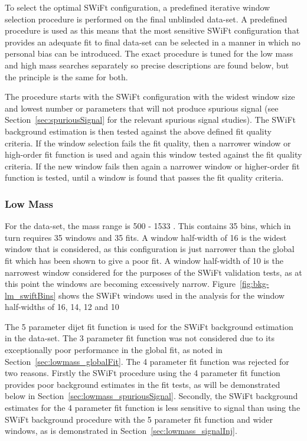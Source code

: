 To select the optimal SWiFt configuration, a predefined iterative window selection procedure is performed on the final unblinded data-set.
A predefined procedure is used as this means that the most sensitive SWiFt configuration that provides an adequate fit to final data-set can be selected
in a manner in which no personal bias can be introduced.
The exact procedure is tuned for the low mass and high mass searches separately so precise descriptions are found below,
but the principle is the same for both.

The procedure starts with the SWiFt configuration with the widest window size and lowest number or parameters that will not produce spurious signal
(see Section~\ref{sec:spuriousSignal} for the relevant spurious signal studies).
The SWiFt background estimation is then tested against the above defined fit quality criteria.
If the window selection fails the fit quality, then a narrower window or high-order fit function is used and again this window tested against the fit quality criteria.
If the new window fails then again a narrower window or higher-order fit function is tested, until a window is found that passes the fit quality criteria.


\subsubsection{Low Mass}
\label{sec:lowmass_windowSel}

For the \lm{} data-set, the mass range is 500 - 1533 \GeV{}. This contains 35 bins, which in turn requires 35 windows and 35 fits.
A window half-width of 16 is  the widest window that is considered,
as this configuration is just narrower than the global fit which has been shown to give a poor fit.
A window half-width of 10 is the narrowest window considered for the purposes of the SWiFt validation tests,
as at this point the windows are becoming excessively narrow.
Figure~\ref{fig:bkg-lm_swiftBins} shows the SWiFt windows used in the \lm{} analysis for the window half-widths of 16, 14, 12 and 10

The 5 parameter dijet fit function is used for the SWiFt background estimation in the \lm{} data-set.
The 3 parameter fit function was not considered due to its exceptionally poor performance in the global fit, as noted in Section~\ref{sec:lowmass_globalFit}.
The 4 parameter fit function was rejected for two reasons.
Firstly the SWiFt procedure using the 4 parameter fit function provides poor background estimates in the fit tests,
as will be demonstrated below in Section~\ref{sec:lowmass_spuriousSignal}.
Secondly, the SWiFt background estimates for the 4 parameter fit function is less sensitive to signal than
using the SWiFt background procedure with the 5 parameter fit function and wider windows, as is demonstrated in Section~\ref{sec:lowmass_signalInj}.

